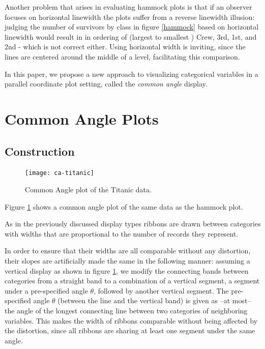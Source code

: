 Another problem that arises in evaluating hammock plots is that if an observer focuses on horizontal linewidth  the plots suffer from a reverse linewidth illusion:  judging the number of survivors by class in figure \ref{hammock} based on horizontal linewidth would result in in ordering of (largest to smallest ) Crew, 3rd, 1st, and 2nd - which is not correct either. Using horizontal width is inviting, since the lines are centered around the middle of a level, facilitating this  comparison. 

In this paper, we propose a new approach to visualizing categorical variables in a parallel coordinate plot setting, called the {\it common angle} display. 


\section{ Common Angle Plots}
\subsection{Construction}


\begin{figure}[htbp] %
   \centering
   \texttt{[image: ca-titanic]} 
   \caption{Common Angle plot of the Titanic data. }
   \label{fig:ca-titanic}
\end{figure}

Figure \ref{fig:ca-titanic} shows a common angle plot of the same data as the hammock plot.

As in the previously discussed display types ribbons are drawn between categories with widths  that are proportional to  the number of records they represent.

In order to ensure that their widths are all comparable without any distortion, their slopes  are artificially made the same in the following manner: 
assuming a vertical display as shown in figure \ref{fig:ca-titanic}, we modify  the connecting bands between  categories from a straight band  to a combination of a vertical  segment, a  segment under a pre-specified angle $\theta$, followed by another vertical  segment.  
The pre-specified angle $\theta$ (between the line and the vertical band) is given as --at most-- the angle of the longest connecting line between two categories of neighboring variables. 
This makes the width of ribbons  comparable without being affected by the distortion, since all ribbons are sharing at least one segment under the same angle. 

